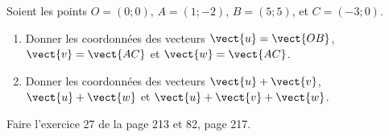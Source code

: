 
\begin{exercice}\label{exosmath-0596}

    Soient les points \( O=(0;0)\), \( A=(1;-2)\), \( B=(5;5)\), et \( C=(-3;0)\).
    \begin{enumerate}
        \item
            Donner les coordonnées des vecteurs \( \vect{ u }=\vect{ OB }\), \( \vect{ v }=\vect{ AC }\) et \( \vect{ w }=\vect{ AC }\).
        \item
            Donner les coordonnées des vecteurs \( \vect{ u }+\vect{ v }\), \( \vect{ u }+\vect{ w }\) et \( \vect{ u }+\vect{ v }+\vect{ w }\).
    \end{enumerate}

    Faire l'exercice 27 de la page 213 et 82, page 217.

\end{exercice}
